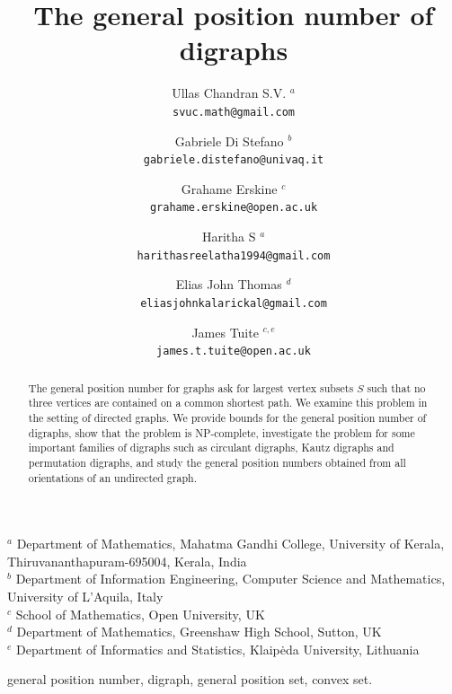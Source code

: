 \documentclass[a4paper,12pt]{article}
\theoremstyle{definition}
\newcommand{\address}[1]{#1}
\begin{document}
	
	\title{The general position number of digraphs}	
	\author{ Ullas Chandran S.V. $^{a}$ \\ \texttt{\footnotesize svuc.math@gmail.com}        
		\and Gabriele Di Stefano $^{b}$ \\ \texttt{\footnotesize gabriele.distefano@univaq.it}
		\and Grahame Erskine $^{c}$ \\ \texttt{\footnotesize grahame.erskine@open.ac.uk}
		\and
		Haritha S $^{a}$ \\ \texttt{\footnotesize harithasreelatha1994@gmail.com}
		\and Elias John Thomas $^{d}$ \\ \texttt{\footnotesize eliasjohnkalarickal@gmail.com}
		\and James Tuite $^{c,e}$ \\ \texttt{\footnotesize james.t.tuite@open.ac.uk}
	}
	
	\maketitle	
	
	\address{
		\noindent
		$^a$  Department of Mathematics, Mahatma Gandhi College, University of Kerala,  \\Thiruvananthapuram-695004, Kerala, India \\
		$^b$ Department of Information Engineering, Computer Science and Mathematics, University of L'Aquila,  Italy \\
		$^c$ School of Mathematics, Open University, UK\\
		$^d$ Department of Mathematics, Greenshaw High School, Sutton, UK \\
		$^e$ Department of Informatics and Statistics, Klaip\.{e}da University, Lithuania\\
		
	}
	
	
	
	\begin{abstract}
		The general position number for graphs ask for largest vertex subsets $S$ such that no three vertices are contained on a common shortest path. We examine this problem in the setting of directed graphs. We provide bounds for the general position number of digraphs, show that the problem is NP-complete, investigate the problem for some important families of digraphs such as circulant digraphs, Kautz digraphs and permutation digraphs, and study the general position numbers obtained from all orientations of an undirected graph.
	\end{abstract}
	 general position number, digraph, general position set, convex set.
	
\end{document}
